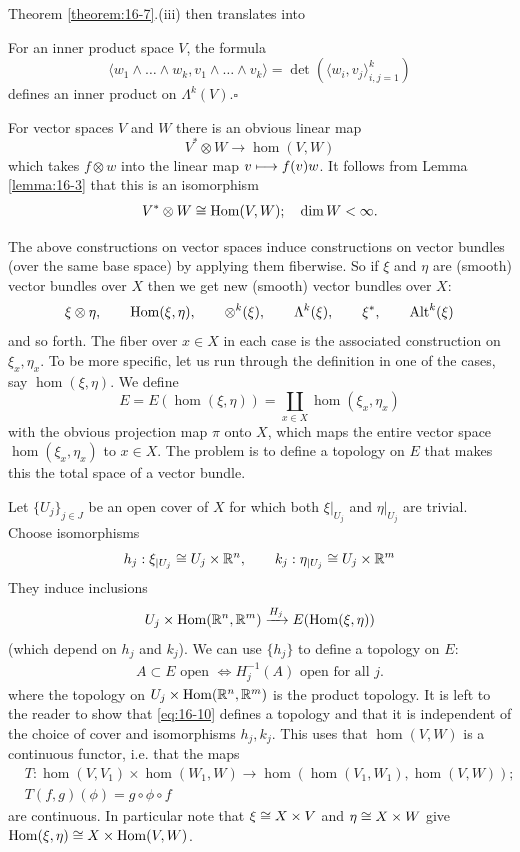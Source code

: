 Theorem \ref{theorem:16-7}.(iii) then translates into 
\begin{addendum}\label{addendum:16-8}
  For an inner product space $V$, the formula
  \[
    \langle w_1\wedge\ldots\wedge w_k, v_1\wedge\ldots\wedge v_k\rangle
    = \det\left(\langle w_i, v_j\rangle_{i,j=1}^k\right)
  \]
  defines an inner product on $\Lambda^k(V)$.\hfill $\square$
\end{addendum}

For vector spaces $V$ and $W$ there is an obvious linear map
\[
  V^*\otimes W\to \hom(V, W)
\]
which takes $f\otimes w$ into the linear map $v\longmapsto f(v)w$. It follows from Lemma \ref{lemma:16-3}
that this is an isomorphism
\begin{align}\label{eq:16-8}
  V^*\otimes W \cong \operatorname{Hom}(V, W);\quad \dim W< \infty.
\end{align}

The above constructions on vector spaces induce constructions on vector bundles
(over the same base space) by applying them fiberwise. So if $\xi$ and $\eta$ are (smooth)
vector bundles over $X$ then we get new (smooth) vector bundles over $X$:
\begin{align}\label{eq:16-9}
  \xi\otimes\eta, \qquad \operatorname{Hom}(\xi, \eta), \qquad \otimes^k(\xi), \qquad \Lambda^k(\xi), 
  \qquad \xi^*, \qquad \operatorname{Alt}^k(\xi)
\end{align}
and so forth. The fiber over $x\in X$ in each case is the associated construction
on $\xi_x, \eta_x$. To be more specific, let us run through the definition in one of the
cases, say $\hom(\xi, \eta)$. We define
\[
  E = E(\hom(\xi, \eta)) = \coprod_{x\in X} \hom(\xi_x, \eta_x)
\]
with the obvious projection map $\pi$ onto $X$, which maps the entire vector space
$\hom(\xi_x, \eta_x)$ to $x\in X$. The problem is to define a topology on $E$ that makes
this the total space of a vector bundle.

Let $\{U_j\}_{j\in J}$ be an open cover of $X$ for which both $\xi|_{U_j}$ and $\eta|_{U_j}$ are trivial.
Choose isomorphisms
\[
  h_j:\xi_{|U_j}\cong U_j\times{\ensuremath{\mathbb{R}}}^{n}, \qquad
  k_j:\eta_{|U_j}\cong U_j\times{\ensuremath{\mathbb{R}}}^{m}
\] 
They induce inclusions
\[
  U_j\times \hom(\RR^n, \RR^m)\xra[H_j] E(\hom(\xi, \eta))
\]
(which depend on $h_j$ and $k_j$). We can use $\{h_j\}$ to define a topology on $E$:
\begin{align}\label{eq:16-10}
  A\subset E \text{ open } \Leftrightarrow H_j^{-1}(A) \text{ open for all } j.
\end{align}
where the topology on $U_j\times \operatorname{Hom}({\mathbb{R}}^n, {\mathbb{R}}^m)$ is the product topology. It is left
to the reader to show that \eqref{eq:16-10} defines a topology and that it is independent of
the choice of cover and isomorphisms $h_j, k_j$. This uses that $\hom(V, W)$ is a
continuous functor, i.e. that the maps
\[
  \begin{aligned}
    & T:\hom(V, V_1)\times \hom(W_1, W)\to \hom(\hom(V_1, W_1), \hom(V, W));\\[.25em]
    & T(f, g)(\phi) = g\circ\phi\circ f
  \end{aligned}
\]
are continuous. In particular note that $\xi\cong X\times V$ and $\eta\cong X\times W$ give $\operatorname{Hom}(\xi, \eta)\cong X\times \operatorname{Hom}(V, W)$.

